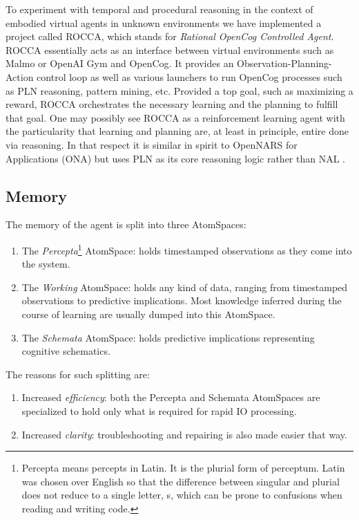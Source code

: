 \documentclass[runningheads]{llncs}
\begin{document}
To experiment with temporal and procedural reasoning in the context of
embodied virtual agents in unknown environments we have implemented a
project called ROCCA, which stands for \emph{Rational OpenCog
Controlled Agent}.  ROCCA essentially acts as an interface between
virtual environments such as Malmo \cite{TODO} or OpenAI Gym
\cite{TODO} and OpenCog.  It provides an Observation-Planning-Action
control loop as well as various launchers to run OpenCog processes
such as PLN reasoning, pattern mining, etc.
Provided a top goal, such as maximizing a reward, ROCCA orchestrates
the necessary learning and the planning to fulfill that goal.
One may possibly see ROCCA as a reinforcement learning agent with the
particularity that learning and planning are, at least in principle,
entire done via reasoning.  In that respect it is similar in spirit to
OpenNARS for Applications (ONA) \cite{TODO} but uses PLN as its core
reasoning logic rather than NAL \cite{TODO}.\\

\subsection{Memory}

The memory of the agent is split into three AtomSpaces:
\begin{enumerate}
\item The \emph{Percepta}\footnote{Percepta means percepts in Latin.
    It is the plurial form of perceptum.  Latin was chosen over
    English so that the difference between singular and plurial does
    not reduce to a single letter, s, which can be prone to confusions
    when reading and writing code.}  AtomSpace: holds timestamped
  observations as they come into the system.
\item The \emph{Working} AtomSpace: holds any kind of data, ranging
  from timestamped observations to predictive implications.  Most
  knowledge inferred during the course of learning are usually dumped
  into this AtomSpace.
\item The \emph{Schemata} AtomSpace: holds predictive implications
  representing cognitive schematics.
\end{enumerate}
The reasons for such splitting are:
\begin{enumerate}
\item Increased \emph{efficiency}: both the Percepta and Schemata
  AtomSpaces are specialized to hold only what is required for rapid
  IO processing.
\item Increased \emph{clarity}: troubleshooting and repairing is also
  made easier that way.
\end{enumerate}
\end{document}
